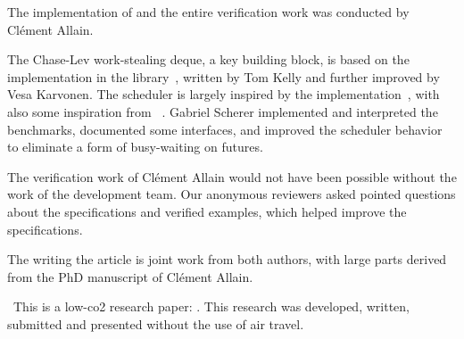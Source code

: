 \begin{acks}

The implementation of \Parabs and the entire verification work was conducted by Clément Allain.

The Chase-Lev work-stealing deque, a key building block, is based on the implementation in the \Saturn library~\citep*{saturn}, written by Tom Kelly and further improved by Vesa Karvonen. The scheduler is 
largely inspired by the \Domainslib implementation~\citep*{domainslib}, with also some inspiration from \Taskflow~\citep*{DBLP:journals/tpds/HuangLLL22}. Gabriel Scherer implemented and interpreted the benchmarks, documented some interfaces, and improved the scheduler behavior to eliminate a form of busy-waiting on futures.

The verification work of Clément Allain would not have been possible without the work of the \Iris development team. Our anonymous reviewers asked pointed questions about the specifications and verified examples, which helped improve the specifications.

The writing the article is joint work from both authors, with large parts derived from the PhD manuscript of Clément Allain.

\lowcotwo\ This is a low-co2 research paper: \lowcotwourl[v1]. This research
was developed, written, submitted and presented without the use of air travel.
\end{acks}
